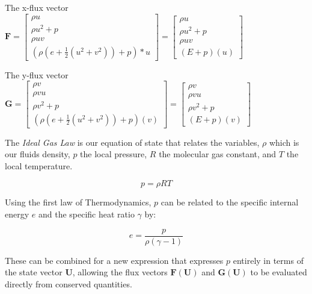 \documentclass[11pt]{article}
\begin{document}
The x-flux vector 
$\textbf{F} = 
\begin{bmatrix}
    \rho u \\[2mm]
    \rho u^{2} + p \\[2mm]
    \rho u v \\[2mm]
    (\rho (e + \frac{1}{2}(u^{2}+v^{2})) + p)* u
\end{bmatrix} = \begin{bmatrix}
   \rho u \\[2mm]
   \rho u^{2} + p \\[2mm]
   \rho u v \\[2mm]
   (E + p)(u)
\end{bmatrix}$
\vspace{5mm}

The y-flux vector
$\textbf{G} = 
\begin{bmatrix}
    \rho v \\[2mm]
    \rho v u \\[2mm]
    \rho v^2 + p \\[2mm]
    (\rho (e + \frac{1}{2}(u^{2}+v^{2})) + p)(v)
\end{bmatrix} = \begin{bmatrix}
   \rho v \\[2mm]
   \rho v u \\[2mm]
   \rho v^2 + p \\[2mm]
   (E + p)(v)
\end{bmatrix}$
\vspace{5mm}


The \textit{Ideal Gas Law} is our equation of state that relates the variables, $\rho$ which is our fluids density, $p$ the local pressure, $R$ the molecular gas constant, and $T$ the local temperature. 
\vspace{1mm}

\begin{equation}
   p = \rho RT 
   \label{IGL}
\end{equation}
\vspace{1.5mm}

Using the first law of Thermodynamics, $p$ can be related to the specific internal energy $e$ and the specific heat ratio $\gamma$ by:

\begin{equation}
   e = \frac{p}{\rho(\gamma-1)}
\end{equation}
\vspace{1.5mm}

These can be combined for a new expression that expresses \( p \) entirely in terms of the state vector \( \mathbf{U} \), allowing the flux vectors \( \mathbf{F(U)} \) and \( \mathbf{G(U)} \) to be evaluated directly from conserved quantities.
\vspace{1mm}
\end{document}

